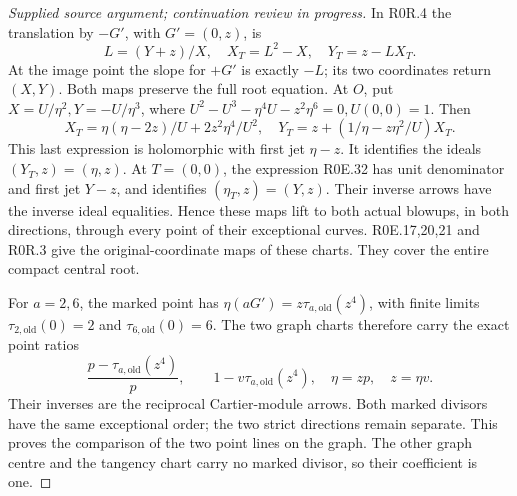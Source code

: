 \begin{proof}[Supplied source argument; continuation review in progress]
In R0R.4 the translation by \(-G'\), with \(G'=(0,z)\), is
\[
 L=(Y+z)/X,\quad X_T=L^2-X,
 \quad Y_T=z-LX_T.                               \tag{R0R.8}
\]
At the image point the slope for \(+G'\) is exactly \(-L\);
its two coordinates return \((X,Y)\). Both maps preserve the full
root equation. At \(O\), put \(X=U/\eta^2,Y=-U/\eta^3\), where
\(U^2-U^3-\eta^4U-z^2\eta^6=0,U(0,0)=1\). Then
\[
 X_T=\eta(\eta-2z)/U+2z^2\eta^4/U^2,
 \quad Y_T=z+(1/\eta-z\eta^2/U)X_T.              \tag{R0R.9}
\]
This last expression is holomorphic with first jet \(\eta-z\).
It identifies the ideals \((Y_T,z)=(\eta,z)\). At \(T=(0,0)\),
the expression R0E.32 has unit denominator and first jet \(Y-z\),
and identifies \((\eta_T,z)=(Y,z)\). Their inverse arrows have
the inverse ideal equalities. Hence these maps lift to both actual
blowups, in both directions, through every point of their exceptional
curves. R0E.17,20,21 and R0R.3 give the original-coordinate maps of
these charts. They cover the entire compact central root.

For \(a=2,6\), the marked point has
\(\eta(aG')=z\tau_{a,\mathrm{old}}(z^4)\), with finite limits
\(\tau_{2,\mathrm{old}}(0)=2\) and
\(\tau_{6,\mathrm{old}}(0)=6\). The two graph charts therefore
carry the exact point ratios
\[
 \frac{p-\tau_{a,\mathrm{old}}(z^4)}p,
 \qquad 1-v\tau_{a,\mathrm{old}}(z^4),
 \quad \eta=zp,\quad z=\eta v.                  \tag{R0R.10}
\]
Their inverses are the reciprocal Cartier-module arrows. Both marked
divisors have the same exceptional order; the two strict directions
remain separate. This proves the comparison of the two point lines
on the graph. The other graph centre and the tangency chart carry no
marked divisor, so their coefficient is one.


\end{proof}

